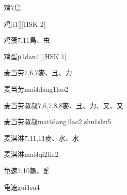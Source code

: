 \begin{entry}{鸡}{7}{⿃}
  \begin{phonetics}{鸡}{ji1}[][HSK 2]
  \end{phonetics}
\end{entry}

\begin{entry}{鸡蛋}{7,11}{⿃、⾍}
  \begin{phonetics}{鸡蛋}{ji1dan4}[][HSK 1]
  \end{phonetics}
\end{entry}

\begin{entry}{麦当劳}{7,6,7}{⿆、⼹、⼒}
  \begin{phonetics}{麦当劳}{mai4dang1lao2}
  \end{phonetics}
\end{entry}

\begin{entry}{麦当劳叔叔}{7,6,7,8,8}{⿆、⼹、⼒、⼜、⼜}
  \begin{phonetics}{麦当劳叔叔}{mai4dang1lao2 shu1shu5}
  \end{phonetics}
\end{entry}

\begin{entry}{麦淇淋}{7,11,11}{⿆、⽔、⽔}
  \begin{phonetics}{麦淇淋}{mai4qi2lin2}
  \end{phonetics}
\end{entry}

\begin{entry}{龟速}{7,10}{⿔、⾡}
  \begin{phonetics}{龟速}{gui1su4}
  \end{phonetics}
\end{entry}


